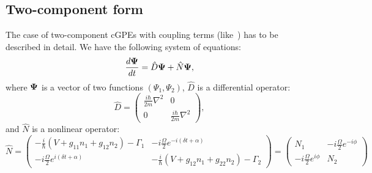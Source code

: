 \subsection{Two-component form}

The case of two-component cGPEs with coupling terms (like~)
has to be described in detail.
We have the following system of equations:
\begin{equation}
\label{eqn:split-step:two-comp-eqn}
	\frac{d \boldsymbol{\Psi}}{dt} = \hat{D} \boldsymbol{\Psi} + \hat{N} \boldsymbol{\Psi},
\end{equation}
where $\boldsymbol{\Psi}$ is a vector of two functions $(\Psi_1, \Psi_2)$,
$\hat{D}$ is a differential operator:
\[
	\hat{D} = \begin{pmatrix}
		\frac{i \hbar}{2 m} \nabla^2 & 0 \\
		0 & \frac{i \hbar}{2 m} \nabla^2
	\end{pmatrix},
\]
and $\hat{N}$ is a nonlinear operator:
\[
	\hat{N} = \begin{pmatrix}
		-\frac{i}{\hbar} \left( V + g_{11} n_1 + g_{12} n_2 \right) - \Gamma_1 &
		-i \frac{\Omega}{2} e^{-i (\delta t + \alpha)} \\
		-i \frac{\Omega}{2} e^{i (\delta t + \alpha)} &
		-\frac{i}{\hbar} \left( V + g_{12} n_1 + g_{22} n_2 \right) - \Gamma_2
	\end{pmatrix}
	= \begin{pmatrix}
		N_1 & -i \frac{\Omega}{2} e^{-i \phi} \\ - i \frac{\Omega}{2} e^{i \phi} & N_2
	\end{pmatrix}
\]

